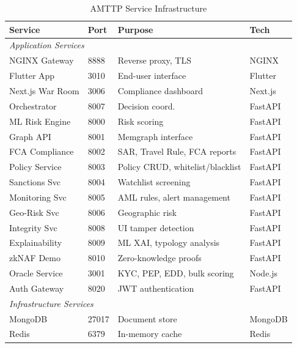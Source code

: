 \documentclass[journal]{IEEEtran}
\begin{document}
\begin{table}[!t]
\centering
\caption{AMTTP Service Infrastructure}
\label{tab:services}
\begin{tabular}{llll}
\toprule
\textbf{Service} & \textbf{Port} & \textbf{Purpose} & \textbf{Tech} \\
\midrule
\multicolumn{4}{l}{\textit{Application Services}} \\
NGINX Gateway   & 8888  & Reverse proxy, TLS          & NGINX \\
Flutter App      & 3010  & End-user interface           & Flutter \\
Next.js War Room & 3006  & Compliance dashboard         & Next.js \\
Orchestrator     & 8007  & Decision coord.              & FastAPI \\
ML Risk Engine   & 8000  & Risk scoring                 & FastAPI \\
Graph API        & 8001  & Memgraph interface           & FastAPI \\
FCA Compliance   & 8002  & SAR, Travel Rule, FCA reports & FastAPI \\
Policy Service   & 8003  & Policy CRUD, whitelist/blacklist & FastAPI \\
Sanctions Svc    & 8004  & Watchlist screening          & FastAPI \\
Monitoring Svc   & 8005  & AML rules, alert management  & FastAPI \\
Geo-Risk Svc     & 8006  & Geographic risk              & FastAPI \\
Integrity Svc    & 8008  & UI tamper detection           & FastAPI \\
Explainability   & 8009  & ML XAI, typology analysis    & FastAPI \\
zkNAF Demo       & 8010  & Zero-knowledge proofs        & FastAPI \\
Oracle Service   & 3001  & KYC, PEP, EDD, bulk scoring  & Node.js \\
Auth Gateway     & 8020  & JWT authentication           & FastAPI \\
\midrule
\multicolumn{4}{l}{\textit{Infrastructure Services}} \\
MongoDB          & 27017 & Document store               & MongoDB \\
Redis            & 6379  & In-memory cache              & Redis \\

\end{tabular}
\end{table}
\end{document}
